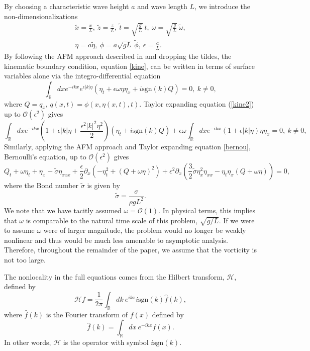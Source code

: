 \documentclass[a4paper,11pt]{article}
\newcommand{\p}{\partial}
\begin{document}
By choosing a characteristic wave height $a$ and wave length $L$, we introduce the non-dimensionalizations 
\begin{align*}
\tilde{x} = \frac{x}{L}, ~\tilde{z} = \frac{z}{L}, ~ \tilde{t} = \sqrt{\frac{g}{L}}~t, ~\omega = \sqrt{\frac{g}{L}}~\tilde{\omega}, \\
\eta = a \tilde{\eta}, ~ \phi  = a\sqrt{gL}~\tilde{\phi} , ~ \epsilon = \frac{a}{L}.
\end{align*}
By following the AFM approach described in \cite{ashton,afm} and dropping the tildes, the kinematic boundary condition, equation \eqref{kine}, can be written in terms of surface variables alone via the integro-differential equation 
\begin{equation}
\int_{\mathbb{R}}dx e^{-ikx}e^{\epsilon|k|\eta}\left(\eta_{t} +
  \epsilon \omega \eta \eta_{x} + i \mbox{sgn}(k)Q \right) = 0, ~
k\neq 0,
\label{kine2}
\end{equation}
where $Q=q_{x}$, $q(x,t) = \phi(x,\eta(x,t),t)$.  Taylor expanding equation (\ref{kine2}) up to $\mathcal{O}(\epsilon^2)$ gives  
\begin{equation}
\int_{\mathbb{R}}dx e^{-ikx}\left(1 + \epsilon |k|\eta + \frac{\epsilon^{2}|k|^{2}\eta^{2}}{2} \right)\left(\eta_{t} + i \mbox{sgn}(k)Q \right) + \epsilon \omega \int_{\mathbb{R}}dx e^{-ikx}\left(1 + \epsilon |k|\eta \right) \eta \eta_{x} = 0, ~ k\neq 0,
\label{integro1}
\end{equation}
Similarly, applying the AFM approach and Taylor expanding equation \eqref{bernou}, Bernoulli's equation, up to $\mathcal{O}(\epsilon^2)$ gives
\[
Q_{t} + \omega \eta_{t} + \eta_{x} - \tilde{\sigma}\eta_{xxx} + \frac{\epsilon}{2}\p_{x}\left(-\eta_{t}^{2} + (Q+\omega \eta)^{2} \right)+ \epsilon^{2}\p_{x}\left( \frac{3}{2}\tilde{\sigma}\eta_{x}^{2}\eta_{xx} - \eta_{t}\eta_{x} \left(Q  + \omega \eta \right) \right) = 0, 
\]
where the Bond number $\tilde{\sigma}$ is given by
\[
\tilde{\sigma} = \frac{\sigma}{\rho g L^2}.
\]
We note that we have tacitly assumed $\omega = \mathcal{O}(1)$.  In physical terms, this implies that $\omega$ is comparable to the natural time scale of this problem, $\sqrt{g/L}$.  If we were to assume $\omega$ were of larger magnitude, the problem would no longer be weakly nonlinear and thus would be much less amenable to asymptotic analysis.  Therefore, throughout the remainder of the paper, we assume that the vorticity is not too large.

The nonlocality in the full equations comes from the Hilbert transform, $\mathcal{H}$, defined by 
\[
\mathcal{H}f = \frac{1}{2\pi}\int_{\mathbb{R}}dk~ e^{ikx}  i\mbox{sgn}(k) \hat{f}(k),
\]
where $\hat{f}(k)$ is the Fourier transform of $f(x)$ defined by
\[
\hat{f}(k) = \int_{\mathbb{R}}dx~ e^{-ikx}f(x).
\]
In other words, $\mathcal{H}$ is the operator with symbol $i\mbox{sgn}(k)$.  
\end{document}
